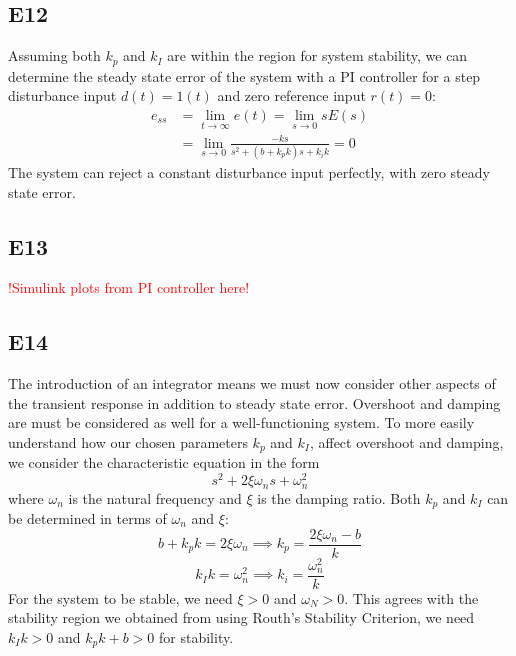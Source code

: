 \documentclass[11pt,titlepage]{article}
\begin{document}
	\subsection*{E12}
		Assuming both $k_p$ and $k_I$ are within the region for system stability, we can determine the steady state error of the system with a PI controller for a step disturbance input $d(t)=1(t)$ and zero reference input $r(t)=0$:
	\begin{align}
		e_{ss}&=\lim_{t\to \infty}e(t)=\lim_{s\to 0}sE(s)\\
		&=\lim_{s\to 0}\frac{-ks}{s^2+(b+k_pk)s+k_ik}=0
	\end{align}
	The system can reject a constant disturbance input perfectly, with zero steady state error. 
	
	\subsection*{E13}
	\textcolor{red}{!Simulink plots from PI controller here!}
	
	\subsection*{E14}
		The introduction of an integrator means we must now consider other aspects of the transient response in addition to steady state error. Overshoot and damping are must be considered as well for a well-functioning system. To more easily understand how our chosen parameters $k_p$ and $k_I$, affect overshoot and damping, we consider the characteristic equation in the form 
	\begin{equation}
		s^2+2\xi\omega_ns+\omega_n^2
	\end{equation} 
	where $\omega_n$ is the natural frequency and $\xi$ is the damping ratio.
	Both $k_p$ and $k_I$ can be determined in terms of $\omega_n$ and $\xi$:
	\begin{equation}
		b+k_pk=2\xi \omega_n \implies k_p=\frac{2\xi \omega_n-b}{k}
	\end{equation}
	\begin{equation}
		k_Ik=\omega_n^2 \implies k_i=\frac{\omega_n^2}{k}
	\end{equation}
	For the system to be stable, we need $\xi >0$ and $\omega_N >0$. This agrees with the stability region we obtained from using Routh's Stability Criterion, we need $k_Ik>0$ and $k_pk+b>0$ for stability.
	
\end{document}
